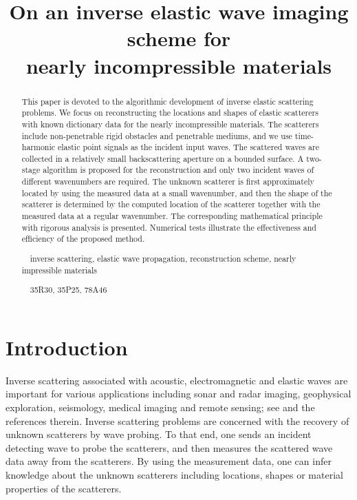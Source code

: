 \documentclass[a4paper,11pt]{article}
\title{On an inverse elastic wave imaging scheme for \\nearly incompressible materials}
\author{\and Jingzhi Li \thanks{Department of Mathematics, Southern University of Science and
Technology, Shenzhen, P. R. China. ({\tt li.jz@sustc.edu.cn})} \and Hongyu Liu \thanks
{Department of Mathematics, Hong Kong Baptist University, Kowloon Tong, Hong Kong SAR, P. R. China.
({\tt hongyu.liuip@gmail.com; hongyuliu@hkbu.edu.hk})} \and Hongpeng Sun
\thanks {Institute for Mathematical Sciences, Renmin University of China, Beijing, P. R. China.
({\tt hpsun@amss.ac.cn})} }
\date{}
\theoremstyle{remark}
\theoremstyle{definition}
\numberwithin{equation}{section}
\begin{document}
\maketitle

\begin{abstract}

This paper is devoted to the algorithmic development of inverse elastic scattering problems.
We focus on reconstructing the locations and shapes of elastic scatterers with known dictionary data for the nearly incompressible materials. The scatterers include non-penetrable rigid obstacles and penetrable mediums, and we use time-harmonic elastic point signals as the incident input waves. The scattered waves are collected in a relatively small backscattering aperture on a bounded surface. A two-stage  algorithm is proposed for the reconstruction and only two incident waves of different wavenumbers are required. The unknown scatterer is first approximately located by using the measured data at a small wavenumber, and then the shape of the scatterer is determined by the computed location of the scatterer together with the measured data at a regular wavenumber. The corresponding mathematical principle with rigorous analysis is presented. Numerical tests illustrate the effectiveness and efficiency of  the proposed method.

\medskip

\medskip

~~inverse scattering, elastic wave propagation, reconstruction scheme, nearly impressible materials

~~35R30, 35P25, 78A46

\end{abstract}


\section{Introduction}\label{sec:intro}

Inverse scattering associated with acoustic, electromagnetic and elastic waves are important for various applications
including sonar and radar imaging, geophysical exploration, seismology, medical imaging and remote sensing; see \cite{AA1, AA2, AA3, CK, Kir1} and the references therein.
Inverse scattering problems are concerned with the recovery of unknown scatterers by wave probing. To that end, one sends an incident detecting wave to probe the scatterers, and then measures the scattered wave data away from the scatterers. By using the measurement data, one can infer knowledge about the unknown scatterers including locations, shapes or material properties of the scatterers.
\end{document}
